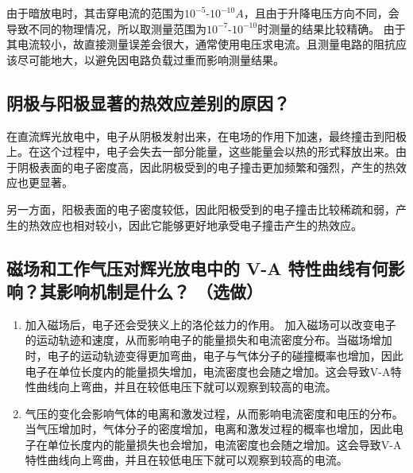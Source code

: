 \documentclass[a4paper,UTF8]{ctexart}
\begin{document}
由于暗放电时，其击穿电流的范围为$10^{-5}$-$10^{-10}A$，且由于升降电压方向不同，会导致不同的物理情况，所以取测量范围为$10^{-7}$-$10^{-10}$时测量的结果比较精确。
由于其电流较小，故直接测量误差会很大，通常使用电压求电流。且测量电路的阻抗应该尽可能地大，以避免因电路负载过重而影响测量结果。

\subsection{阴极与阳极显著的热效应差别的原因？}

在直流辉光放电中，电子从阴极发射出来，在电场的作用下加速，最终撞击到阳极上。在这个过程中，电子会失去一部分能量，这些能量会以热的形式释放出来。由于阴极表面的电子密度高，因此阴极受到的电子撞击更加频繁和强烈，产生的热效应也更显著。

另一方面，阳极表面的电子密度较低，因此阳极受到的电子撞击比较稀疏和弱，产生的热效应也相对较小，因此它能够更好地承受电子撞击产生的热效应。

\subsection{磁场和工作气压对辉光放电中的 V-A 特性曲线有何影响？其影响机制是什么？
（选做）}

\begin{enumerate}
    \item 加入磁场后，电子还会受狭义上的洛伦兹力的作用。
    加入磁场可以改变电子的运动轨迹和速度，从而影响电子的能量损失和电流密度分布。当磁场增加时，电子的运动轨迹变得更加弯曲，电子与气体分子的碰撞概率也增加，因此电子在单位长度内的能量损失增加，电流密度也会随之增加。这会导致V-A特性曲线向上弯曲，并且在较低电压下就可以观察到较高的电流。
    \item 气压的变化会影响气体的电离和激发过程，从而影响电流密度和电压的分布。当气压增加时，气体分子的密度增加，电离和激发过程的概率也增加，因此电子在单位长度内的能量损失也会增加，电流密度也会随之增加。这会导致V-A特性曲线向上弯曲，并且在较低电压下就可以观察到较高的电流。
\end{enumerate}
\end{document}
